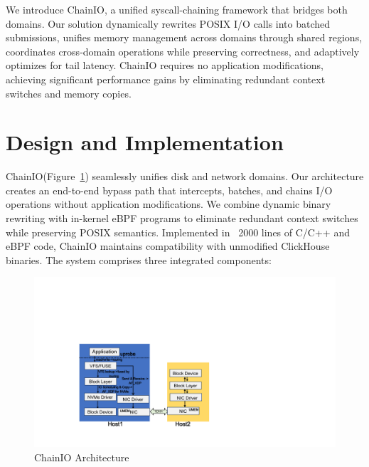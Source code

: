 \documentclass[sigconf,10pt]{acmart}
\newcommand{\sys}{ChainIO\xspace}
\begin{document}
We introduce \sys, a unified syscall-chaining framework that bridges both domains. Our solution dynamically rewrites POSIX I/O calls into batched submissions, unifies memory management across domains through shared regions, coordinates cross-domain operations while preserving correctness, and adaptively optimizes for tail latency. \sys requires no application modifications, achieving significant performance gains by eliminating redundant context switches and memory copies.

\section{Design and Implementation}\label{sec:design-impl}

\sys (Figure~\ref{fig:bur}) seamlessly unifies disk and network domains. Our architecture creates an end-to-end bypass path that intercepts, batches, and chains I/O operations without application modifications. We combine dynamic binary rewriting with in-kernel eBPF programs to eliminate redundant context switches while preserving POSIX semantics. Implemented in ~2000 lines of C/C++ and eBPF code, \sys maintains compatibility with unmodified ClickHouse binaries. The system comprises three integrated components:

\begin{figure}[h]
\centering
\includegraphics[width=\columnwidth]{img/bur.pdf}
\caption{\sys Architecture}\label{fig:bur}
\end{figure}
\end{document}
